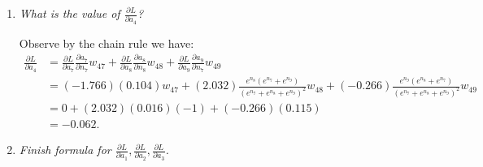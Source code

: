 \documentclass[12pt,oneside,reqno]{amsart}
\theoremstyle{plain}
\theoremstyle{definition}
\theoremstyle{remark}
\newcommand{\bee}{\begin{equation}\begin{aligned}}
\newcommand{\eee}{\end{aligned}\end{equation}}
\newcommand{\fracc}{\frac}
\newcommand{\lpar}{\left(}
\newcommand{\rpar}{\right)}
\begin{document}
\begin{enumerate}[label=\arabic*.]
\begin{enumerate}
\item \textit{What is the value of $\fracc{\partial L}{\partial a_4}$?}

Observe by the chain rule we have:
\bee
\fracc{\partial L}{\partial a_4} &= 
\fracc{\partial L}{\partial a_7}\fracc{\partial a_7}{\partial n_7}w_{47} + 
\fracc{\partial L}{\partial a_8}\fracc{\partial a_8}{\partial n_8}w_{48} + 
\fracc{\partial L}{\partial a_9}\fracc{\partial a_9}{\partial n_7}w_{49}\\
&=  (-1.766)(0.104)w_{47} + (2.032)\fracc{e^{n_8}\lpar e^{n_7} + e^{n_9} \rpar }{\lpar e^{n_7} + e^{n_8} + e^{n_9} \rpar ^2}w_{48} + (-0.266)\fracc{e^{n_9}\lpar e^{n_8} + e^{n_7} \rpar }{\lpar e^{n_7} + e^{n_8} + e^{n_9} \rpar ^2}w_{49}\\
&= 0 + (2.032)(0.016)(-1) + (-0.266)(0.115)\\
&= -0.062.
\eee

\item \textit{Finish formula for $\fracc{\partial L}{\partial a_1},\fracc{\partial L}{\partial a_2},\fracc{\partial L}{\partial a_3}$.}


\end{enumerate}
\end{enumerate}
\end{document}

